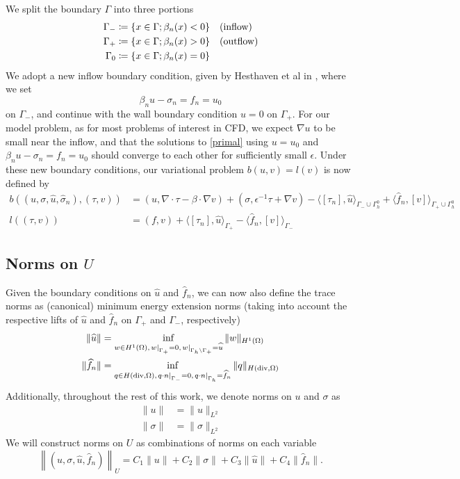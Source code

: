 \documentclass[11pt,onecolumn]{scrartcl}
\newcommand{\grad}{\nabla}
\renewcommand{\div}{\grad \cdot}
\begin{document}
We split the boundary $\Gamma$ into three portions
\begin{align*}
\Gamma_{-} &\coloneqq \{x\in \Gamma; \beta_n(x) < 0\} \quad {\rm (inflow)}\\
\Gamma_{+} &\coloneqq \{x\in \Gamma; \beta_n(x) > 0\} \quad {\rm (outflow)}\\
\Gamma_{0} &\coloneqq \{x\in \Gamma; \beta_n(x) = 0\}
\end{align*}
We adopt a new inflow boundary condition, given by Hesthaven et al in \cite{Hesthaven96astable}, where we set
\[
\beta_n u - \sigma_n = f_n = u_0
\]
on $\Gamma_-$, and continue with the wall boundary condition $u=0$ on $\Gamma_+$.  For our model problem, as for most problems of interest in CFD, we expect $\grad u$ to be small near the inflow, and that the solutions to \eqref{primal} using $u=u_0$ and $\beta_n u - \sigma_n = f_n = u_0$ should converge to each other for sufficiently small $\epsilon$.  Under these new boundary conditions, our variational problem $b(u,v) = l(v)$ is now defined by
\begin{align*}
b\left(\left(u,\sigma, \widehat{u}, \widehat{\sigma}_n\right), \left(\tau, v\right)\right) &= \left(u,\div \tau - \beta \cdot \grad v\right) + \left(\sigma, \epsilon^{-1} \tau + \grad v\right) - \langle \left[\tau_n\right], \widehat{u} \rangle_{\Gamma_-\cup \Gamma_h^0} + \langle \widehat{f}_n, \left[v\right] \rangle_{\Gamma_+ \cup \Gamma_h^0} \\
l\left(\left(\tau,v\right)\right) &= \left(f, v\right) + \langle \left[\tau_n\right], \widehat{u} \rangle_{\Gamma_+} - \langle \widehat{f}_n, \left[v\right] \rangle_{\Gamma_-} 
\end{align*}

\subsection{Norms on $U$}

Given the boundary conditions on $\widehat{u}$ and $\widehat{f}_n$, we can now also define the trace norms as (canonical) minimum energy extension norms (taking into account the respective lifts of $\widehat{u}$ and $\widehat{f}_n$ on $\Gamma_+$ and $\Gamma_-$, respectively)
\begin{align*}
\|\widehat{u}\| &= \inf_{w\in H^1(\Omega), \left.w\right|_{\Gamma_+}=0, \left.w\right |_{\Gamma_h\setminus \Gamma_+ } = \widehat{u}} \|w\|_{H^1(\Omega)}\\
\|\widehat{f}_n\| &= \inf_{q\in H({\rm div},\Omega), \left.q\cdot n\right|_{\Gamma_-}= 0, \left. q\cdot n \right |_{\Gamma_h} = \widehat{f}_n} \|q\|_{H({\rm div},\Omega)}
\end{align*}
Additionally, throughout the rest of this work, we denote norms on $u$ and $\sigma$ as
\begin{align*}
\|u\| &= \|u\|_{L^2} \\
\|\sigma\| &= \|\sigma\|_{L^2}
\end{align*}
We will construct norms on $U$ as combinations of norms on each variable
\[
\left\|\left(u,\sigma,\widehat{u},\widehat{f}_n\right)\right\|_U = C_1 \|u\| + C_2 \|\sigma\| + C_3 \|\widehat{u}\| + C_4 \|\widehat{f}_n\|.
\]
\end{document}
